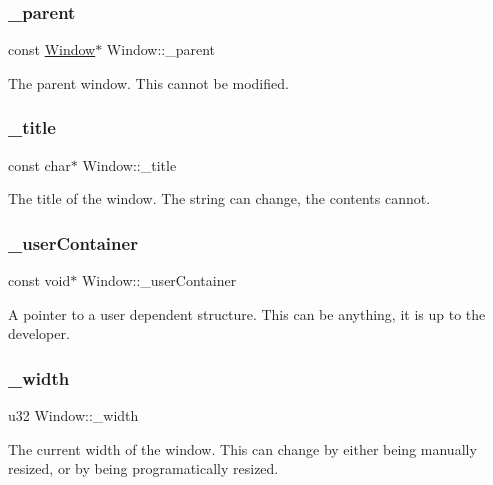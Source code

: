 \subsubsection{\texorpdfstring{\+\_\+parent}{\_parent}}
{\footnotesize\ttfamily const \mbox{\hyperlink{class_window}{Window}}$\ast$ Window\+::\+\_\+parent\hspace{0.3cm}{\ttfamily [private]}}

The parent window. This cannot be modified. \mbox{\label{class_window_a452e9568dc406269180adbf31360ef74}} 
\subsubsection{\texorpdfstring{\+\_\+title}{\_title}}
{\footnotesize\ttfamily const char$\ast$ Window\+::\+\_\+title\hspace{0.3cm}{\ttfamily [private]}}

The title of the window. The string can change, the contents cannot. \mbox{\label{class_window_a23e83496dec6b6ec76cb6a194d818796}} 
\subsubsection{\texorpdfstring{\+\_\+user\+Container}{\_userContainer}}
{\footnotesize\ttfamily const void$\ast$ Window\+::\+\_\+user\+Container\hspace{0.3cm}{\ttfamily [private]}}

A pointer to a user dependent structure. This can be anything, it is up to the developer. \mbox{\label{class_window_af019aa4d8f873000e1970f1e767bb5e4}} 
\subsubsection{\texorpdfstring{\+\_\+width}{\_width}}
{\footnotesize\ttfamily u32 Window\+::\+\_\+width\hspace{0.3cm}{\ttfamily [private]}}

The current width of the window. This can change by either being manually resized, or by being programatically resized. \mbox{\label{class_window_a1c6d0c1750d8bd3f6d34d966d53e4696}} 
